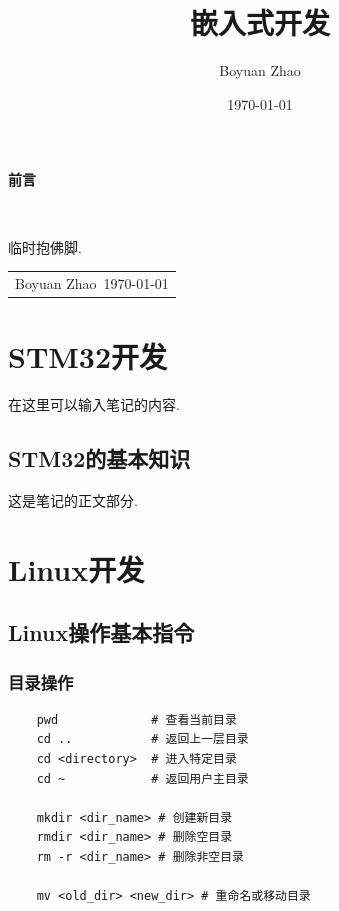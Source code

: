 \documentclass[12pt, a4paper, oneside]{ctexbook}
\title{{\Huge{\textbf{嵌入式开发}}}}
\author{Boyuan Zhao}
\date{\today}
\numberwithin{figure}{section}
\begin{document}
\maketitle

\setcounter{page}{1}

\begin{center}
    \Huge\textbf{前言}
\end{center}~\

临时抱佛脚. 
~\
\begin{flushright}
    \begin{tabular}{c}
        Boyuan Zhao\
        \today
    \end{tabular}
\end{flushright}

\newpage
{}
\setcounter{page}{1}
\tableofcontents

\newpage
\setcounter{page}{1}

\chapter{STM32开发}

在这里可以输入笔记的内容. 

\section{STM32的基本知识}

这是笔记的正文部分. 

\clearpage

\chapter{Linux开发}

\section{Linux操作基本指令}

\subsection{目录操作}

\begin{verbatim}
    pwd             # 查看当前目录
    cd ..           # 返回上一层目录
    cd <directory>  # 进入特定目录
    cd ~            # 返回用户主目录

    mkdir <dir_name> # 创建新目录
    rmdir <dir_name> # 删除空目录
    rm -r <dir_name> # 删除非空目录

    mv <old_dir> <new_dir> # 重命名或移动目录
\end{verbatim}
\end{document}
